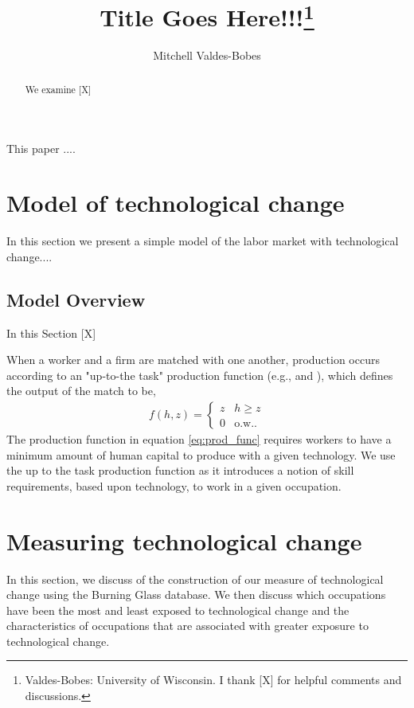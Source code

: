 \documentclass[12pt]{article}
\begin{document}
\title{Title Goes Here!!!\thanks{Valdes-Bobes: University of Wisconsin.
		I thank [X] for helpful comments and discussions.}}
\author{Mitchell Valdes-Bobes}
\maketitle
\begin{abstract}
	We examine [X]
\end{abstract}
\thispagestyle{empty}

\pagebreak{}
This paper .... 


\section{Model of technological change \label{sec:model}}

In this section we present a simple model of the labor market with technological change....


\subsection{Model Overview \label{subsec:model_overview}}

In this Section [X]

When a worker and a firm are matched with one another, production occurs according to an "up-to-the task" production function (e.g., \citet{albrecht2002matching} and \citet{jarosch2019statistical}), which defines the output of the match to be,
\begin{align}
		f(h,z)=\begin{cases}
			z & h\ge z\\
			0 & \text{o.w.} \label{eq:prod_func}.
		\end{cases}
\end{align}
The production function in equation \ref{eq:prod_func} requires workers to have a minimum amount of human capital to produce with a given technology. We use the up to the task production function as it introduces a notion of skill requirements, based upon technology, to work in a given occupation.	
	
\section{Measuring technological change} \label{sec: measuring_tech_change}

In this section, we discuss of the construction of our measure of technological change using the Burning Glass database. We then discuss which occupations have been the most and least exposed to technological change and the characteristics of occupations that are associated with greater exposure to technological change. 
\end{document}
